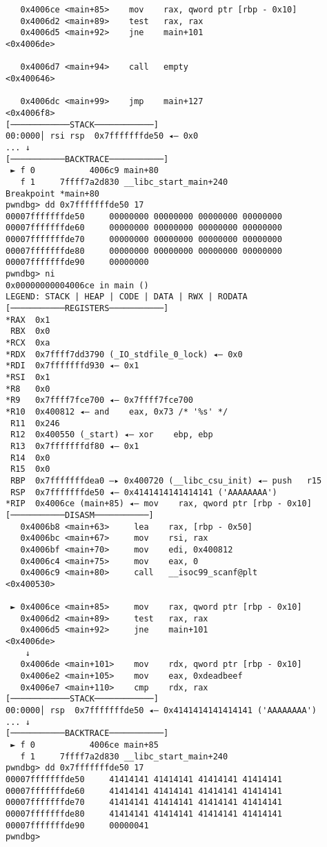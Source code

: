 \documentclass{article}
\begin{document}
\begin{lstlisting}
   0x4006ce <main+85>    mov    rax, qword ptr [rbp - 0x10]
   0x4006d2 <main+89>    test   rax, rax
   0x4006d5 <main+92>    jne    main+101                      <0x4006de>
 
   0x4006d7 <main+94>    call   empty                         <0x400646>
 
   0x4006dc <main+99>    jmp    main+127                      <0x4006f8>
[────────────STACK────────────]
00:0000│ rsi rsp  0x7fffffffde50 ◂— 0x0
... ↓
[───────────BACKTRACE───────────]
 ► f 0           4006c9 main+80
   f 1     7ffff7a2d830 __libc_start_main+240
Breakpoint *main+80
pwndbg> dd 0x7fffffffde50 17
00007fffffffde50     00000000 00000000 00000000 00000000
00007fffffffde60     00000000 00000000 00000000 00000000
00007fffffffde70     00000000 00000000 00000000 00000000
00007fffffffde80     00000000 00000000 00000000 00000000
00007fffffffde90     00000000
pwndbg> ni
0x00000000004006ce in main ()
LEGEND: STACK | HEAP | CODE | DATA | RWX | RODATA
[───────────REGISTERS───────────]
*RAX  0x1
 RBX  0x0
*RCX  0xa
*RDX  0x7ffff7dd3790 (_IO_stdfile_0_lock) ◂— 0x0
*RDI  0x7fffffffd930 ◂— 0x1
*RSI  0x1
*R8   0x0
*R9   0x7ffff7fce700 ◂— 0x7ffff7fce700
*R10  0x400812 ◂— and    eax, 0x73 /* '%s' */
 R11  0x246
 R12  0x400550 (_start) ◂— xor    ebp, ebp
 R13  0x7fffffffdf80 ◂— 0x1
 R14  0x0
 R15  0x0
 RBP  0x7fffffffdea0 —▸ 0x400720 (__libc_csu_init) ◂— push   r15
 RSP  0x7fffffffde50 ◂— 0x4141414141414141 ('AAAAAAAA')
*RIP  0x4006ce (main+85) ◂— mov    rax, qword ptr [rbp - 0x10]
[───────────DISASM───────────]
   0x4006b8 <main+63>     lea    rax, [rbp - 0x50]
   0x4006bc <main+67>     mov    rsi, rax
   0x4006bf <main+70>     mov    edi, 0x400812
   0x4006c4 <main+75>     mov    eax, 0
   0x4006c9 <main+80>     call   __isoc99_scanf@plt            <0x400530>
 
 ► 0x4006ce <main+85>     mov    rax, qword ptr [rbp - 0x10]
   0x4006d2 <main+89>     test   rax, rax
   0x4006d5 <main+92>     jne    main+101                      <0x4006de>
    ↓
   0x4006de <main+101>    mov    rdx, qword ptr [rbp - 0x10]
   0x4006e2 <main+105>    mov    eax, 0xdeadbeef
   0x4006e7 <main+110>    cmp    rdx, rax
[────────────STACK────────────]
00:0000│ rsp  0x7fffffffde50 ◂— 0x4141414141414141 ('AAAAAAAA')
... ↓
[───────────BACKTRACE───────────]
 ► f 0           4006ce main+85
   f 1     7ffff7a2d830 __libc_start_main+240
pwndbg> dd 0x7fffffffde50 17
00007fffffffde50     41414141 41414141 41414141 41414141
00007fffffffde60     41414141 41414141 41414141 41414141
00007fffffffde70     41414141 41414141 41414141 41414141
00007fffffffde80     41414141 41414141 41414141 41414141
00007fffffffde90     00000041
pwndbg> 
\end{lstlisting}
\end{document}
